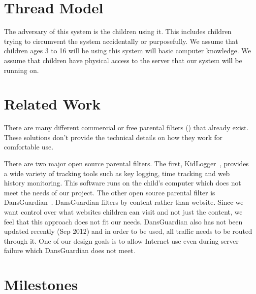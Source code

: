 \documentclass[12pt] {article}
\begin{document}
\section*{Thread Model}
The adversary of this system is the children using it. This includes children
trying to circumvent the system accidentally or purposefully. We assume that
children ages 3 to 16 will be using this system will basic computer knowledge.
We assume that children have physical access to the server that our system will
be running on.

\section*{Related Work}
There are many different commercial or free parental filters
(\cite{k9}\cite{netnanny}\cite{mcafee}) that already exist. These solutions
don't provide the technical details on how they work for comfortable use.

There are two major open source parental filters. The first,
KidLogger~\cite{kidlogger}, provides a wide variety of tracking tools such as
key logging, time tracking and web history monitoring. This software runs on
the child's computer which does not meet the needs of our project. The other
open source parental filter is DansGuardian~\cite{dansgaurdian}. DansGuardian
filters by content rather than website. Since we want control over what
websites children can visit and not just the content, we feel that this
approach does not fit our needs.  DansGuardian also has not been updated
recently (Sep 2012) and in order to be used, all traffic needs to be routed
through it. One of our design goals is to allow Internet use even during server
failure which DansGuardian does not meet.

\section*{Milestones}


{
  
  
}
\end{document}
